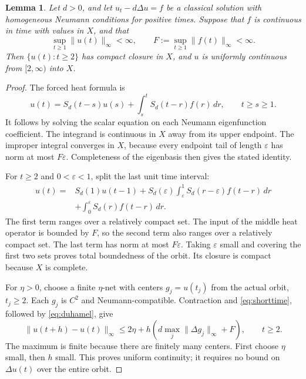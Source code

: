 \documentclass[11pt,a4paper]{article}
\newtheorem{lemma}[theorem]{Lemma}
\begin{document}
\begin{lemma}\label{lem:compact}
Let \(d>0\), and let \(u_t-d\Delta u=f\) be a classical solution with
homogeneous Neumann conditions for positive times. Suppose that \(f\)
is continuous in time with values in \(X\), and that
\[
 \sup_{t\ge1}\|u(t)\|_\infty<\infty,\qquad
 F:=\sup_{t\ge1}\|f(t)\|_\infty<\infty.
\]
Then \(\{u(t):t\ge2\}\) has compact closure in \(X\), and \(u\) is
uniformly continuous from \([2,\infty)\) into \(X\).
\end{lemma}
\begin{proof}
The forced heat formula is
\begin{equation}\label{eq:duhamel}
 u(t)=S_d(t-s)u(s)+\int_s^tS_d(t-r)f(r)\,dr,\qquad t\ge s\ge1.
\end{equation}
It follows by solving the scalar equation on each Neumann eigenfunction
coefficient. The integrand is continuous in \(X\) away from its upper
endpoint. The improper integral converges in \(X\), because every
endpoint tail of length \(\varepsilon\) has norm at most \(F\varepsilon\).
Completeness of the eigenbasis then gives the stated identity.

For \(t\ge2\) and \(0<\varepsilon<1\), split the last unit time interval:
\begin{align*}
 u(t)={}&S_d(1)u(t-1)
 +S_d(\varepsilon)\int_\varepsilon^1
           S_d(r-\varepsilon)f(t-r)\,dr\\
 &+\int_0^\varepsilon S_d(r)f(t-r)\,dr .
\end{align*}
The first term ranges over a relatively compact set. The input of the
middle heat operator is bounded by \(F\), so the second term also ranges
over a relatively compact set. The last term has norm at most
\(F\varepsilon\). Taking \(\varepsilon\) small and covering the first
two sets proves total boundedness of the orbit. Its closure is compact
because \(X\) is complete.

For \(\eta>0\), choose a finite \(\eta\)-net with centers
\(g_j=u(t_j)\) from the actual orbit, \(t_j\ge2\). Each \(g_j\) is
\(C^2\) and Neumann-compatible. Contraction and \eqref{eq:shorttime},
followed by \eqref{eq:duhamel}, give
\[
 \|u(t+h)-u(t)\|_\infty
 \le2\eta+h\left(d\max_j\|\Delta g_j\|_\infty+F\right),\qquad t\ge2 .
\]
The maximum is finite because there are finitely many centers. First
choose \(\eta\) small, then \(h\) small. This proves uniform continuity;
it requires no bound on \(\Delta u(t)\) over the entire orbit.
\end{proof}
\end{document}
